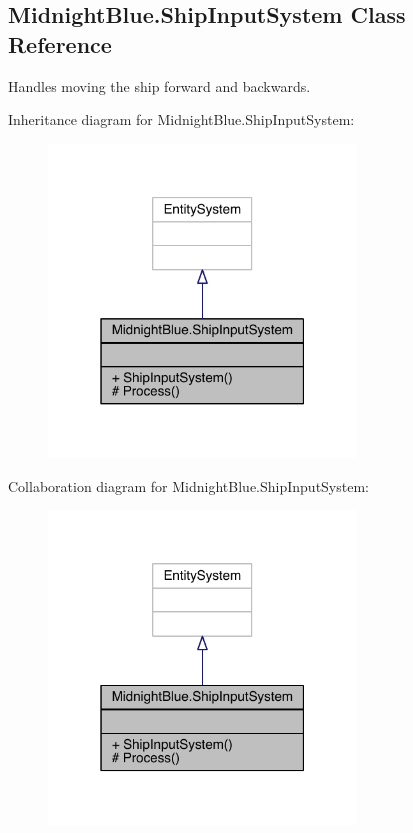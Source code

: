 \hypertarget{class_midnight_blue_1_1_ship_input_system}{}\subsection{Midnight\+Blue.\+Ship\+Input\+System Class Reference}
\label{class_midnight_blue_1_1_ship_input_system}


Handles moving the ship forward and backwards.  




Inheritance diagram for Midnight\+Blue.\+Ship\+Input\+System\+:\nopagebreak
\begin{figure}[H]
\begin{center}
\leavevmode
\includegraphics[width=232pt]{class_midnight_blue_1_1_ship_input_system__inherit__graph}
\end{center}
\end{figure}


Collaboration diagram for Midnight\+Blue.\+Ship\+Input\+System\+:\nopagebreak
\begin{figure}[H]
\begin{center}
\leavevmode
\includegraphics[width=232pt]{class_midnight_blue_1_1_ship_input_system__coll__graph}
\end{center}
\end{figure}
